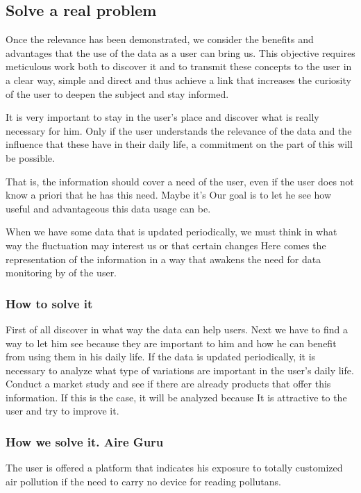 \subsection{Solve a real problem}
Once the relevance has been demonstrated, we consider the benefits and advantages that the use of the data as a user can bring us.
This objective requires meticulous work both to discover it and to transmit these concepts to the user in a clear way,
simple and direct and thus achieve a link that increases the curiosity of the user to deepen the subject and
stay informed.

It is very important to stay in the user's place and discover what is really necessary for him. Only if the user understands the relevance of
the data and the influence that these have in their daily life, a commitment on the part of this will be possible.

That is, the information should cover a need of the user, even if the user does not know a priori that he has this need. Maybe it's
Our goal is to let he see how useful and advantageous this data usage can be.

When we have some data that is updated periodically, we must think in what way the fluctuation may interest us or that certain
changes Here comes the representation of the information in a way that awakens the need for data monitoring by
of the user.

\subsubsection*{How to solve it} 
First of all discover in what way the data can help users. Next we have to find a way to let him see
because they are important to him and how he can benefit from using them in his daily life.
If the data is updated periodically, it is necessary to analyze what type of variations are important in the user's daily life.
Conduct a market study and see if there are already products that offer this information. If this is the case, it will be analyzed because
It is attractive to the user and try to improve it.

\subsubsection*{How we solve it. Aire Guru} 
The user is offered a platform that indicates his exposure to totally customized air pollution if the need to carry
no device for reading pollutans.



